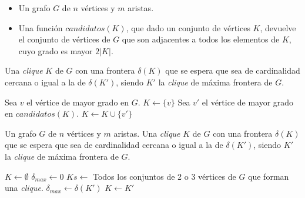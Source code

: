 \begin{pseudocodigo}
    \Require\Statex
        \begin{itemize}
            \item Un grafo $G$ de $n$ v\'ertices y $m$ aristas.

            \item Una funci\'on $candidatos(K)$, que dado un conjunto de v\'ertices
                $K$, devuelve el conjunto de v\'ertices de $G$ que son adjacentes
                a todos los elementos de $K$, cuyo grado es mayor $2|K|$.
        \end{itemize}

    \Statex

    \Ensure Una \emph{clique} $K$ de $G$ con una frontera $\delta(K)$ que se
        espera que sea de cardinalidad cercana o igual a la de $\delta(K')$,
        siendo $K'$ la \emph{clique} de m\'axima frontera de $G$.

    \Statex

    \State Sea $v$ el v\'ertice de mayor grado en $G$.
    \State $K \gets \{v\}$
        \State Sea $v'$ el v\'ertice de mayor grado en $candidatos(K)$.
        \State $K \gets K \cup \{v'\}$
    \EndWhile

    \State {}
\end{pseudocodigo}

\begin{pseudocodigo}
    \Require Un grafo $G$ de $n$ v\'ertices y $m$ aristas.
    \Ensure Una \emph{clique} $K$ de $G$ con una frontera $\delta(K)$ que se
        espera que sea de cardinalidad cercana o igual a la de $\delta(K')$,
        siendo $K'$ la \emph{clique} de m\'axima frontera de $G$.

    \Statex

    \State $K \gets \emptyset$
    \State $\delta_{max} \gets 0$
    \State $Ks \gets $ Todos los conjuntos de 2 o 3 v\'ertices de $G$ que
        forman una \emph{clique}.
            \State $\delta_{max} \gets \delta(K')$
            \State $K \gets K'$

        \EndIf

    \EndForEach

    \State {}
\end{pseudocodigo}
